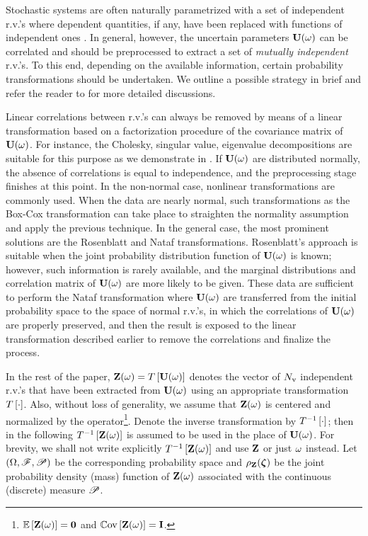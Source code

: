 Stochastic systems are often naturally parametrized with a set of independent r.v.'s where dependent quantities, if any, have been replaced with functions of independent ones \cite{xiu2009}. In general, however, the uncertain parameters $\mathbf{U}(\omega)$ can be correlated and should be preprocessed to extract a set of \emph{mutually independent} r.v.'s. To this end, depending on the available information, certain probability transformations should be undertaken. We outline a possible strategy in brief and refer the reader to \cite{eldred2009, xiu2009} for more detailed discussions.

Linear correlations between r.v.'s can always be removed by means of a linear transformation based on a factorization procedure of the covariance matrix of $\mathbf{U}(\omega)$. For instance, the Cholesky, singular value, eigenvalue decompositions \cite{press2007} are suitable for this purpose as we demonstrate in . If $\mathbf{U}(\omega)$ are distributed normally, the absence of correlations is equal to independence, and the preprocessing stage finishes at this point. In the non-normal case, nonlinear transformations are commonly used. When the data are nearly normal, such transformations as the Box-Cox transformation \cite{box1964} can take place to straighten the normality assumption and apply the previous technique. In the general case, the most prominent solutions are the Rosenblatt \cite{rosenblatt1952} and Nataf \cite{hongshuang2008} transformations. Rosenblatt's approach is suitable when the joint probability distribution function of $\mathbf{U}(\omega)$ is known; however, such information is rarely available, and the marginal distributions and correlation matrix of $\mathbf{U}(\omega)$ are more likely to be given. These data are sufficient to perform the Nataf transformation where $\mathbf{U}(\omega)$ are transferred from the initial probability space to the space of normal r.v.'s, in which the correlations of $\mathbf{U}(\omega)$ are properly preserved, and then the result is exposed to the linear transformation described earlier to remove the correlations and finalize the process.

In the rest of the paper, $\mathbf{Z}(\omega) = T\left[\mathbf{U}(\omega)\right]$ denotes the vector of ${N_\text{v}}$ independent r.v.'s that have been extracted from $\mathbf{U}(\omega)$ using an appropriate transformation $T\left[\cdot\right]$. Also, without loss of generality, we assume that $\mathbf{Z}(\omega)$ is centered and normalized by the operator\footnote{$\oExp{\vZ(\o)} = \mZero$ and $\oCov{\vZ(\o)} = \mI$.}. Denote the inverse transformation by $T^{-1}\left[\cdot\right]$; then in the following $T^{-1}\left[\mathbf{Z}(\omega)\right]$ is assumed to be used in the place of $\mathbf{U}(\omega)$. For brevity, we shall not write explicitly $T^{-1}\left[\mathbf{Z}(\omega)\right]$ and use $\mathbf{Z}$ or just $\omega$ instead. Let $(\Omega, \mathscr{F}, \mathscr{P})$ be the corresponding probability space and $\rho_{\mathbf{Z}}(\boldsymbol{\zeta})$ be the joint probability density (mass) function of $\mathbf{Z}(\omega)$ associated with the continuous (discrete) measure $\mathscr{P}$.
